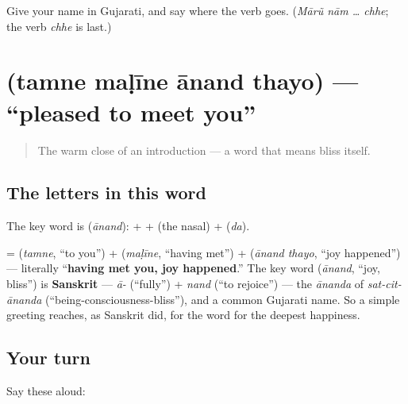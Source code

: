 \begin{tcolorbox}[breakable,colback=teal!4,colframe=teal!35!black,title={Before you move on}]
Give your name in Gujarati, and say where the verb goes. (\emph{Mārũ nām … chhe}; the verb \emph{chhe} is last.)
\end{tcolorbox}
\section[\gu{તમને} \gu{મળીને} \gu{આનંદ} \gu{થયો}]{    (tamne maḷīne ānand thayo) — \textquotedblleft{}pleased to meet you\textquotedblright{}}

\label{lesson:GU-C02-anand}



\begin{quote}
The warm close of an introduction — a word that means bliss itself.
\end{quote}

\subsection*{The letters in this word}
The key word is \textbf{} (\emph{ānand}): \textbf{} + \textbf{} + \textbf{} (the nasal) + \textbf{} (\emph{da}).

\begin{cousinweb}
\textbf{   } = \textbf{} (\emph{tamne}, \textquotedblleft{}to you\textquotedblright{}) + \textbf{} (\emph{maḷīne}, \textquotedblleft{}having met\textquotedblright{}) + \textbf{ } (\emph{ānand thayo}, \textquotedblleft{}joy happened\textquotedblright{}) — literally \textquotedblleft{}\textbf{having met you, joy happened}.\textquotedblright{} The key word \textbf{} (\emph{ānand}, \textquotedblleft{}joy, bliss\textquotedblright{}) is \textbf{Sanskrit} — \emph{ā-} (\textquotedblleft{}fully\textquotedblright{}) + \emph{nand} (\textquotedblleft{}to rejoice\textquotedblright{}) — the \emph{ānanda} of \emph{sat-cit-ānanda} (\textquotedblleft{}being-consciousness-bliss\textquotedblright{}), and a common Gujarati name. So a simple greeting reaches, as Sanskrit did, for the word for the deepest happiness.
\end{cousinweb}

\subsection*{Your turn}
Say these aloud:

